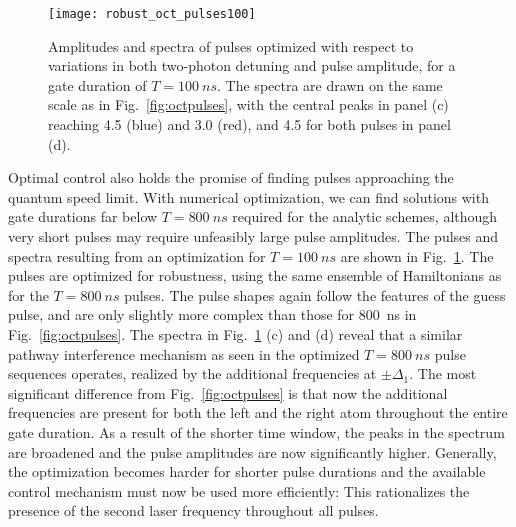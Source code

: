 \begin{figure}[tb]
  \centering
  \texttt{[image: robust\_oct\_pulses100]}
  \caption{%
  Amplitudes and spectra of pulses optimized with respect to variations
  in both two-photon detuning and pulse amplitude, for a gate duration of
  $T=\SI{100}{ns}$. The spectra are drawn on the same scale as in
  Fig.~\ref{fig:octpulses}, with the central peaks in panel (c) reaching 4.5
  (blue) and 3.0 (red), and 4.5 for both pulses in panel (d).
  }
  \label{fig:octpulses100}
\end{figure}
Optimal control also holds the promise of finding pulses approaching the quantum
speed limit. With numerical optimization, we can find solutions with
gate durations far below $T=\SI{800}{ns}$
required for the analytic schemes, although very short pulses may require
unfeasibly large pulse amplitudes.
The pulses and spectra resulting from an
optimization for $T=\SI{100}{ns}$ are shown in Fig.~\ref{fig:octpulses100}. The
pulses are optimized for robustness, using the same ensemble of Hamiltonians
as for the $T=\SI{800}{ns}$ pulses. The pulse shapes again follow the features of the
guess pulse, and are only slightly more complex than those for \SI{800}{ns} in
Fig.~\ref{fig:octpulses}.
The spectra in Fig.~\ref{fig:octpulses100} (c) and (d)  reveal that
a similar pathway interference 
mechanism as seen in the optimized  $T=\SI{800}{ns}$ pulse sequences 
operates, realized by the additional frequencies at $\pm
\Delta_1$. The most significant 
difference from Fig.~\ref{fig:octpulses} is that now the additional frequencies
are present for both the left and the right atom throughout the entire gate
duration. As a result of the shorter time window, 
the peaks in the spectrum are broadened and the
pulse amplitudes are now significantly higher. Generally, the optimization
becomes harder for shorter pulse durations and the available control
mechanism must now be used more efficiently: This rationalizes the
presence of the 
second laser frequency throughout all pulses.

